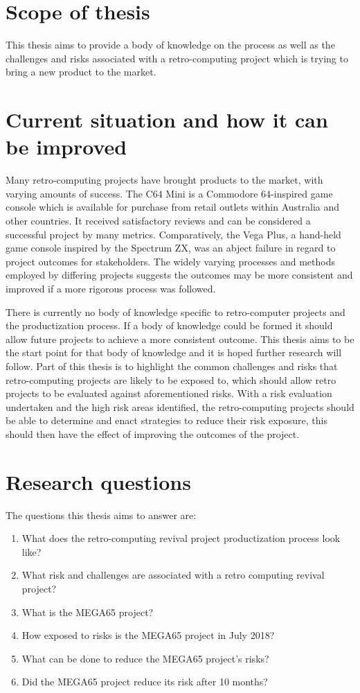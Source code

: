 \section{Scope of thesis}
This thesis aims to provide a body of knowledge on the process as well as the challenges and risks associated with a retro-computing project which is trying to bring a new product to the market. 


\section{Current situation and how it can be improved}
Many retro-computing projects have brought products to the market, with varying amounts of success. The C64 Mini is a Commodore 64-inspired game console which is available for purchase from retail outlets within Australia and other countries. It received satisfactory reviews and can be considered a successful project by many metrics. Comparatively, the Vega Plus, a hand-held game console inspired by the Spectrum ZX, was an abject failure in regard to project outcomes for stakeholders. The widely varying processes and methods employed by differing projects suggests the outcomes may be more consistent and improved if a more rigorous process was followed. 

There is currently no body of knowledge specific to retro-computer projects and the productization process. If a body of knowledge could be formed it should allow future projects to achieve a more consistent outcome. This thesis aims to be the start point for that body of knowledge and it is hoped further research will follow. Part of this thesis is to highlight the common challenges and risks that retro-computing projects are likely to be exposed to, which should allow retro projects to be evaluated against aforementioned risks. With a risk evaluation undertaken and the high risk areas identified, the retro-computing projects should be able to determine and enact strategies to reduce their risk exposure, this should then have the effect of improving the outcomes of the project.


\section{Research questions}
The questions this thesis aims to answer are:
\begin{enumerate}
\item What does the retro-computing revival project productization process look like?
\item What risk and challenges are associated with a retro computing revival project?
\item What is the MEGA65 project? 
\item How exposed to risks is the MEGA65 project in July 2018?
\item What can be done to reduce the MEGA65 project's risks?
\item Did the MEGA65 project reduce its risk after 10 months?
\end{enumerate}



